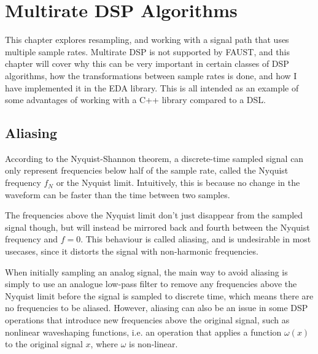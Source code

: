 \chapter{Multirate DSP Algorithms}
\label{chap:multirate}

This chapter explores resampling, and working with a signal path that uses multiple sample rates. Multirate
DSP is not supported by FAUST\autocite{faustwebsite}, and this chapter will cover why this can be very
important in certain classes of DSP algorithms, how the transformations between sample rates is done, and how
I have implemented it in the EDA library. This is all intended as an example of some advantages of working
with a C++ library compared to a DSL.

\section{Aliasing}

According to the Nyquist-Shannon theorem\autocite{shannon49}, a discrete-time sampled signal can only
represent frequencies below half of the sample rate, called the Nyquist frequency $f_N$ or
the Nyquist limit. Intuitively, this is because no change in the waveform can be faster than the time between
two samples.

The frequencies above the Nyquist limit don't just disappear from the sampled signal though, but will instead
be mirrored back and fourth between the Nyquist frequency and $f = 0$. This behaviour is
called aliasing, and is undesirable in most usecases, since it distorts the signal with non-harmonic
frequencies.

When initially sampling an analog signal, the main way to avoid aliasing is simply to use an analogue
low-pass filter to remove any frequencies above the Nyquist limit before the signal is sampled to discrete
time\autocite{an699},  which means there are no frequencies to be aliased. However, aliasing can also
be an issue in some DSP operations that introduce new frequencies above the original signal, such as
nonlinear waveshaping functions, i.e. an operation that applies a function $\omega(x)$ to the
original signal $x$, where $\omega$ is non-linear.

